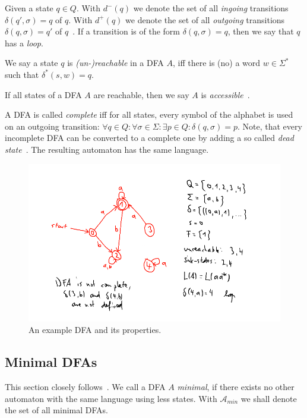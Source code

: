 Given a state $q \in Q$. With $d^-(q)$ we denote the set of all \emph{ingoing} transitions $\delta(q', \sigma) = q$ of $q$. With $d^+(q)$ we denote the set of all \emph{outgoing} transitions $\delta(q, \sigma) = q'$ of $q$~\cite[pp. 2-3]{champarnaud05}. If a transition is of the form $\delta(q, \sigma) = q$, then we say that $q$ has a \emph{loop}.

\begin{definition}\label{ch:1:unreachable-states}
	We say a state $q$ is \emph{(un-)reachable} in a DFA $A$, iff there is (no) a word $w \in \Sigma^*$ such that $\delta^*(s, w) = q$.
\end{definition}
\noindent If all states of a DFA $A$ are reachable, then we say $A$ is \emph{accessible}~\cite[p. 2]{champarnaud05}.

A DFA is called \emph{complete} iff for all states, every symbol of the alphabet is used on an outgoing transition: $\forall q\in Q\colon \forall\sigma\in\Sigma\colon \exists p\in Q\colon \delta(q,\sigma) = p$. Note, that every incomplete DFA can be converted to a complete one by adding a so called \emph{dead state}~\cite[p. 67]{hopcroft01}. The resulting automaton has the same language.

\begin{figure}
	\includegraphics[width=\linewidth]{images/dfa.png}
	\caption{An example DFA and its properties.}
	\label{fig:dfa}
\end{figure}

\subsection{Minimal DFAs}

This section closely follows~\cite[pp. 42-45]{schoening01}. We call a DFA $A$ \emph{minimal}, if there exists no other automaton with the same language using less states. With $\mathcal{A}_{min}$ we shall denote the set of all minimal DFAs.

